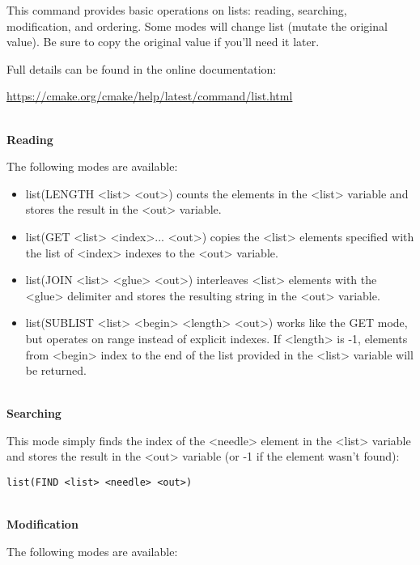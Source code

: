This command provides basic operations on lists: reading, searching, modification, and ordering. Some modes will change list (mutate the original value). Be sure to copy the original value if you'll need it later.

Full details can be found in the online documentation: 

\url{https://cmake.org/cmake/help/latest/command/list.html}

\hspace*{\fill} \\ %
\noindent
\textbf{Reading}

The following modes are available:

\begin{itemize}
\item 
list(LENGTH <list> <out>) counts the elements in the <list> variable and stores the result in the <out> variable.

\item 
list(GET <list> <index>... <out>) copies the <list> elements specified with the list of <index> indexes to the <out> variable.

\item 
list(JOIN <list> <glue> <out>) interleaves <list> elements with the <glue> delimiter and stores the resulting string in the <out> variable.

\item 
list(SUBLIST <list> <begin> <length> <out>) works like the GET mode, but operates on range instead of explicit indexes. If <length> is -1, elements from <begin> index to the end of the list provided in the <list> variable will be returned.
\end{itemize}

\hspace*{\fill} \\ %
\noindent
\textbf{Searching}

This mode simply finds the index of the <needle> element in the <list> variable and stores the result in the <out> variable (or -1 if the element wasn't found):

\begin{lstlisting}[style=styleCMake]
list(FIND <list> <needle> <out>)
\end{lstlisting}

\hspace*{\fill} \\ %
\noindent
\textbf{Modification}

The following modes are available:

